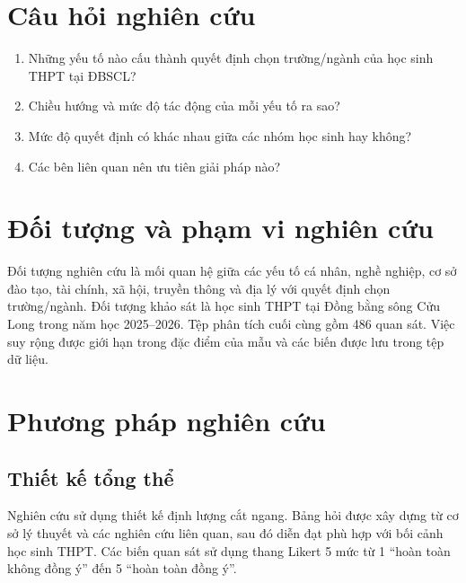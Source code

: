 \section{Câu hỏi nghiên cứu}
\begin{enumerate}[label=RQ\arabic*:]
\item Những yếu tố nào cấu thành quyết định chọn trường/ngành của học sinh THPT tại ĐBSCL?
\item Chiều hướng và mức độ tác động của mỗi yếu tố ra sao?
\item Mức độ quyết định có khác nhau giữa các nhóm học sinh hay không?
\item Các bên liên quan nên ưu tiên giải pháp nào?
\end{enumerate}

\section{Đối tượng và phạm vi nghiên cứu}
Đối tượng nghiên cứu là mối quan hệ giữa các yếu tố cá nhân, nghề nghiệp, cơ sở đào tạo, tài chính, xã hội, truyền thông và địa lý với quyết định chọn trường/ngành. Đối tượng khảo sát là học sinh THPT tại Đồng bằng sông Cửu Long trong năm học 2025--2026. Tệp phân tích cuối cùng gồm 486 quan sát. Việc suy rộng được giới hạn trong đặc điểm của mẫu và các biến được lưu trong tệp dữ liệu.

\section{Phương pháp nghiên cứu}
\subsection{Thiết kế tổng thể}
Nghiên cứu sử dụng thiết kế định lượng cắt ngang. Bảng hỏi được xây dựng từ cơ sở lý thuyết và các nghiên cứu liên quan, sau đó diễn đạt phù hợp với bối cảnh học sinh THPT. Các biến quan sát sử dụng thang Likert 5 mức từ 1 ``hoàn toàn không đồng ý'' đến 5 ``hoàn toàn đồng ý''.

